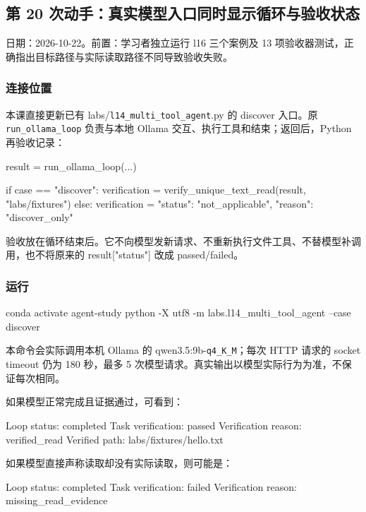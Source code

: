 \documentclass[UTF8,zihao=-4,fontset=fandol]{ctexart}
\begin{document}
\subsection{第 20 次动手：真实模型入口同时显示循环与验收状态}

日期：2026-10-22。前置：学习者独立运行 l16 三个案例及 13 项验收器测试，正确指出目标路径与实际读取路径不同导致验收失败。

\subsubsection{连接位置}

本课直接更新已有 labs/\nolinkurl{l14_multi_tool_agent}.py 的 discover 入口。原 \nolinkurl{run_ollama_loop} 负责与本地 Ollama 交互、执行工具和结束；返回后，Python 再验收记录：

\begin{Code}
result = run_ollama_loop(...)

if case == "discover":
    verification = verify_unique_text_read(result, "labs/fixtures")
else:
    verification = {"status": "not_applicable", "reason": "discover_only"}
\end{Code}

验收放在循环结束后。它不向模型发新请求、不重新执行文件工具、不替模型补调用，也不将原来的 result["status"] 改成 passed/failed。

\subsubsection{运行}

\begin{Code}
conda activate agent-study
python -X utf8 -m labs.l14_multi_tool_agent --case discover
\end{Code}

本命令会实际调用本机 Ollama 的 qwen3.5:9b-\nolinkurl{q4_K_M}；每次 HTTP 请求的 socket timeout 仍为 180 秒，最多 5 次模型请求。真实输出以模型实际行为为准，不保证每次相同。

如果模型正常完成且证据通过，可看到：

\begin{Code}
Loop status: completed
Task verification: passed
Verification reason: verified_read
Verified path: labs/fixtures/hello.txt
\end{Code}

如果模型直接声称读取却没有实际读取，则可能是：

\begin{Code}
Loop status: completed
Task verification: failed
Verification reason: missing_read_evidence
\end{Code}
\end{document}
